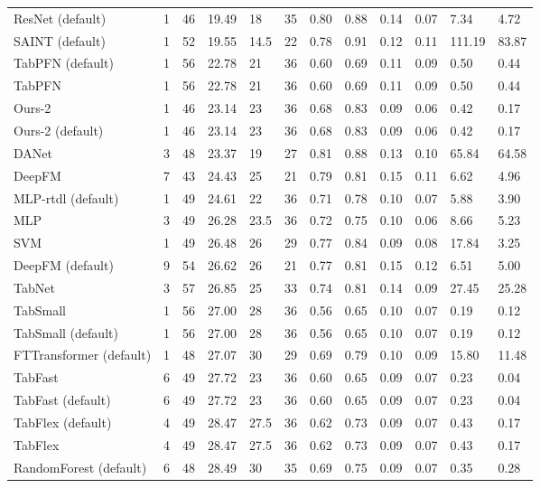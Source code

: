 \begin{tabular}{lllllrllllll}
ResNet (default) & 1 & 46 & 19.49 & 18 & 35 & 0.80 & 0.88 & 0.14 & 0.07 & 7.34 & 4.72 \\
SAINT (default) & 1 & 52 & 19.55 & 14.5 & 22 & 0.78 & 0.91 & 0.12 & 0.11 & 111.19 & 83.87 \\
TabPFN (default) & 1 & 56 & 22.78 & 21 & 36 & 0.60 & 0.69 & 0.11 & 0.09 & 0.50 & 0.44 \\
TabPFN & 1 & 56 & 22.78 & 21 & 36 & 0.60 & 0.69 & 0.11 & 0.09 & 0.50 & 0.44 \\
Ours-2 & 1 & 46 & 23.14 & 23 & 36 & 0.68 & 0.83 & 0.09 & 0.06 & 0.42 & 0.17 \\
Ours-2 (default) & 1 & 46 & 23.14 & 23 & 36 & 0.68 & 0.83 & 0.09 & 0.06 & 0.42 & 0.17 \\
DANet & 3 & 48 & 23.37 & 19 & 27 & 0.81 & 0.88 & 0.13 & 0.10 & 65.84 & 64.58 \\
DeepFM & 7 & 43 & 24.43 & 25 & 21 & 0.79 & 0.81 & 0.15 & 0.11 & 6.62 & 4.96 \\
MLP-rtdl (default) & 1 & 49 & 24.61 & 22 & 36 & 0.71 & 0.78 & 0.10 & 0.07 & 5.88 & 3.90 \\
MLP & 3 & 49 & 26.28 & 23.5 & 36 & 0.72 & 0.75 & 0.10 & 0.06 & 8.66 & 5.23 \\
SVM & 1 & 49 & 26.48 & 26 & 29 & 0.77 & 0.84 & 0.09 & 0.08 & 17.84 & 3.25 \\
DeepFM (default) & 9 & 54 & 26.62 & 26 & 21 & 0.77 & 0.81 & 0.15 & 0.12 & 6.51 & 5.00 \\
TabNet & 3 & 57 & 26.85 & 25 & 33 & 0.74 & 0.81 & 0.14 & 0.09 & 27.45 & 25.28 \\
TabSmall & 1 & 56 & 27.00 & 28 & 36 & 0.56 & 0.65 & 0.10 & 0.07 & 0.19 & 0.12 \\
TabSmall (default) & 1 & 56 & 27.00 & 28 & 36 & 0.56 & 0.65 & 0.10 & 0.07 & 0.19 & 0.12 \\
FTTransformer (default) & 1 & 48 & 27.07 & 30 & 29 & 0.69 & 0.79 & 0.10 & 0.09 & 15.80 & 11.48 \\
TabFast & 6 & 49 & 27.72 & 23 & 36 & 0.60 & 0.65 & 0.09 & 0.07 & 0.23 & 0.04 \\
TabFast (default) & 6 & 49 & 27.72 & 23 & 36 & 0.60 & 0.65 & 0.09 & 0.07 & 0.23 & 0.04 \\
TabFlex (default) & 4 & 49 & 28.47 & 27.5 & 36 & 0.62 & 0.73 & 0.09 & 0.07 & 0.43 & 0.17 \\
TabFlex & 4 & 49 & 28.47 & 27.5 & 36 & 0.62 & 0.73 & 0.09 & 0.07 & 0.43 & 0.17 \\
RandomForest (default) & 6 & 48 & 28.49 & 30 & 35 & 0.69 & 0.75 & 0.09 & 0.07 & 0.35 & 0.28 \\

\end{tabular}
